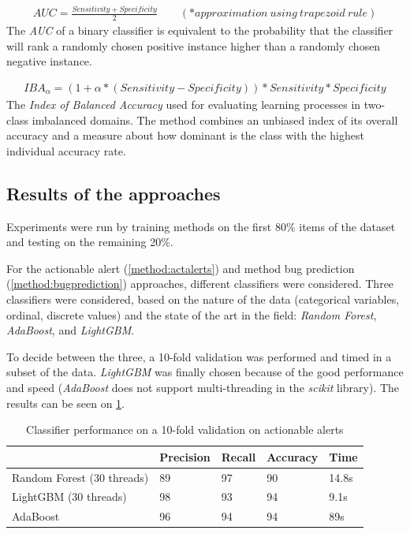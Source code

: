 \begin{gather*}
AUC = \frac{Sensitivity + Specificity}{2} \qquad (*approximation \ using \ trapezoid \ rule)
\end{gather*} 
The \textit{AUC} of a binary classifier is equivalent to the probability that the classifier will rank a randomly chosen positive instance higher than a randomly chosen negative instance.


\begin{gather*}
IBA_{\alpha} = (1 + \alpha * (Sensitivity - Specificity)) * Sensitivity * Specificity
\end{gather*} 
The \textit{Index of Balanced Accuracy} used for evaluating learning processes in two-class imbalanced domains. The
method combines an unbiased index of its overall accuracy and a measure about
how dominant is the class with the highest individual accuracy rate.



\subsection{Results of the approaches}

Experiments were run by training methods on the first 80\% items of the dataset and testing on the remaining 20\%.

For the actionable alert (\cref{method:actalerts}) and method bug prediction (\cref{method:bugprediction}) approaches, different classifiers were considered. Three classifiers were considered, based on the nature of the data (categorical variables, ordinal, discrete values) and the state of the art in the field: \textit{Random Forest}, \textit{AdaBoost}, and \textit{LightGBM}.

To decide between the three, a 10-fold validation was performed and timed in a subset of the data. \textit{LightGBM} was finally chosen because of the good performance and speed (\textit{AdaBoost} does not support multi-threading in the \textit{scikit} library).
The results can be seen on \cref{choosing_classifier}.

\begin{longtable}[c]{@{}lllll@{}}
	\caption{Classifier performance on a 10-fold validation on actionable alerts}
	\label{choosing_classifier}\\
	\toprule
	& Precision & Recall & Accuracy & Time  \\* \midrule
	\endfirsthead
	\endhead
	\bottomrule
	\endfoot
	\endlastfoot
	Random Forest (30 threads) & 89        & 97     & 90       & 14.8s \\
	LightGBM (30 threads)      & 98        & 93     & 94       & 9.1s  \\
	AdaBoost      & 96        & 94     & 94       & 89s   \\* \bottomrule
\end{longtable}


